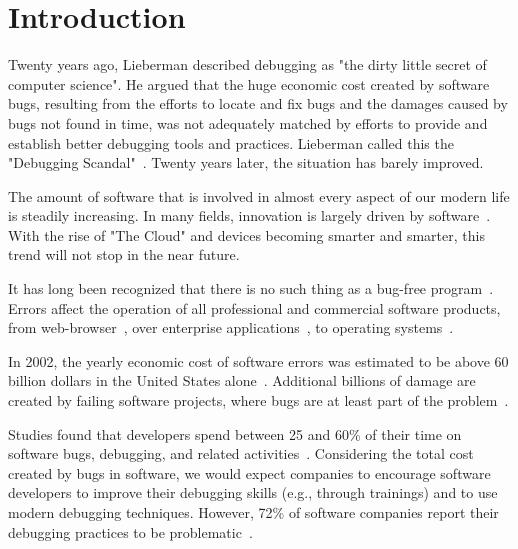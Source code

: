 \chapter{Introduction}
\label{sec:introduction}

Twenty years ago, Lieberman described debugging as "the dirty little secret of computer science".
He argued that the huge economic cost created by software bugs, resulting from the efforts to locate and fix bugs and the damages caused by bugs  not found in time, was not adequately matched by efforts to provide and establish better debugging tools and practices.
Lieberman called this the "Debugging Scandal"~\cite{lieberman_97_the_debugging_scandal}.
Twenty years later, the situation has barely improved.

The amount of software that is involved in almost every aspect of our modern life is steadily increasing.
In many fields, innovation is largely driven by software~\cite{evans_08_invisible_engines_how_software, gorschek_10_a_lightweight_innovation_process}.
With the rise of "The Cloud" and devices becoming smarter and smarter, this trend will not stop in the near future.

It has long been recognized that there is no such thing as a bug-free program~\cite{schwartz_71_an_overview_of_bugs}.
Errors affect the operation of all professional and commercial software products, from web-browser~\cite{li_06_have_things_changed_now}, over enterprise applications~\cite{turhan_09_data_mining_source_code, sahoo_10_an_empirical_study}, to operating systems~\cite{guo_10_characterizing_and_predicting_which}. %

In 2002, the yearly economic cost of software errors was estimated to be above 60 billion dollars in the United States alone~\cite{tassey_02_the_economic_impacts}. 
Additional billions of damage are created by failing software projects, where bugs are at least part of the problem~\cite{charette_05_why_software_fails}.

Studies found that developers spend between 25 and 60\% of their time on software bugs, debugging, and related activities~\cite{ballou_08_improving_software_quality, hailpern_02_software_debugging_testing, beizer_03_software_testing_techniques}.
Considering the total cost created by bugs in software, we would expect companies to encourage software developers to improve their debugging skills (e.g., through trainings) and to use modern debugging techniques.
However, 72\% of software companies report their debugging practices to be problematic~\cite{ballou_08_improving_software_quality}.

